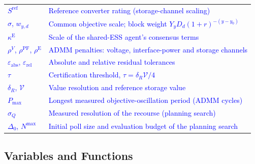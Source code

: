 \documentclass[preprint,12pt]{elsarticle}
\begin{document}
\begin{longtable}{@{}>{\raggedright\arraybackslash}p{} >{\raggedright\arraybackslash}p{}@{}}
        \textcolor{blue}{$S^{\text{ref}}$} & \textcolor{blue}{Reference converter rating (storage-channel scaling)} \\
        \textcolor{blue}{$\sigma$, $w_{y,d}$} & \textcolor{blue}{Common objective scale; block weight $Y_y D_d (1+r)^{-(y-y_0)}$} \\
        \textcolor{blue}{$\kappa^{\text{E}}$} & \textcolor{blue}{Scale of the shared-ESS agent's consensus terms} \\
        \textcolor{blue}{$\rho^{V}$, $\rho^{\text{PF}}$, $\rho^{\text{E}}$} & \textcolor{blue}{ADMM penalties: voltage, interface-power and storage channels} \\
        \textcolor{blue}{$\varepsilon_{\text{abs}}$, $\varepsilon_{\text{rel}}$} & \textcolor{blue}{Absolute and relative residual tolerances} \\
        \textcolor{blue}{$\tau$} & \textcolor{blue}{Certification threshold, $\tau = \delta_R \mathcal{V}/4$} \\
        \textcolor{blue}{$\delta_R$, $\mathcal{V}$} & \textcolor{blue}{Value resolution and reference storage value} \\
        \textcolor{blue}{$P_{\max}$} & \textcolor{blue}{Longest measured objective-oscillation period (ADMM cycles)} \\
        \textcolor{blue}{$\sigma_Q$} & \textcolor{blue}{Measured resolution of the recourse (planning search)} \\
        \textcolor{blue}{$\Delta_0$, $N^{\max}$} & \textcolor{blue}{Initial poll size and evaluation budget of the planning search} \\
    \end{longtable}
    \addtocounter{table}{-1}
\endgroup

\subsection*{Variables and Functions}
\end{document}
